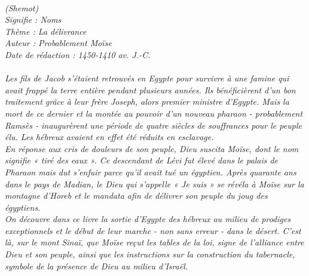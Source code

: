 \BFont
\noindent\hrulefill
\textit{
\bigskip
{\centering{}
\\(Shemot)
\\Signifie : Noms
\\Thème : La délivrance
\\Auteur : Probablement Moïse
\\Date de rédaction : 1450-1410 av. J.-C.\\}
}
\textit{
\\Les fils de Jacob s’étaient retrouvés en Egypte pour survivre à une famine qui avait frappé la terre entière pendant plusieurs années. Ils bénéficièrent d’un bon traitement grâce à leur frère Joseph, alors premier ministre d’Egypte. Mais la mort de ce dernier et la montée au pouvoir d’un nouveau pharaon - probablement Ramsès - inaugurèrent une période de quatre siècles de souffrances pour le peuple élu. Les hébreux avaient en effet été réduits en esclavage.
\bigskip
\\En réponse aux cris de douleurs de son peuple, Dieu suscita Moïse, dont le nom signifie « tiré des eaux ». Ce descendant de Lévi fut élevé dans le palais de Pharaon mais dut s’enfuir parce qu’il avait tué un égyptien. Après quarante ans dans le pays de Madian, le Dieu qui s’appelle « Je suis » se révéla à Moïse sur la montagne d’Horeb et le mandata afin de délivrer son peuple du joug des égyptiens.
\bigskip
\\On découvre dans ce livre la sortie d’Egypte des hébreux au milieu de prodiges exceptionnels et le début de leur marche - non sans erreur - dans le désert. C’est là, sur le mont Sinaï, que Moïse reçut les tables de la loi, signe de l’alliance entre Dieu et son peuple, ainsi que les instructions sur la construction du tabernacle, symbole de la présence de Dieu au milieu d’Israël.\bigskip
}
\par\nobreak\noindent\hrulefill
